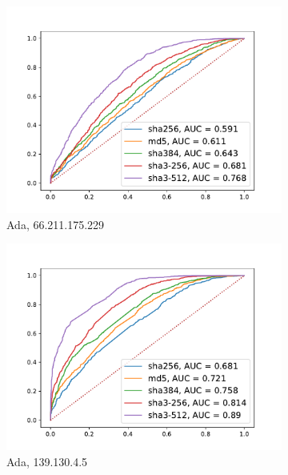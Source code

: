 \documentclass[12pt,a4paper,automark, toc=bib]{scrreprt}
\theoremstyle{definition}
\begin{document}
\begin{figure}
\begin{subfigure}{0.32\linewidth}
					\includegraphics[width=\linewidth]{figures/66.211.175.229_50_AdaBoost.pdf}
					\caption{Ada, 66.211.175.229}
				\end{subfigure}
				\begin{subfigure}{0.32\linewidth}
					\centering
					\includegraphics[width=\linewidth]{figures/139.130.4.5_50_AdaBoost.pdf}
					\caption{Ada, 139.130.4.5}
				\end{subfigure}
				\begin{subfigure}{0.32\linewidth}
					\centering

\end{subfigure}
\end{figure}
\end{document}
